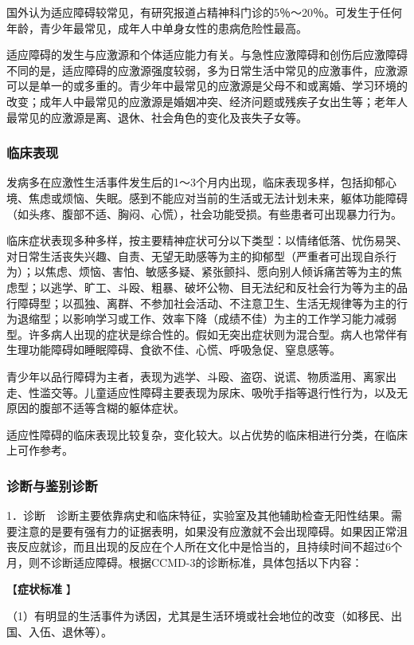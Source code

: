 国外认为适应障碍较常见，有研究报道占精神科门诊的5％～20％。可发生于任何年龄，青少年最常见，成年人中单身女性的患病危险性最高。

适应障碍的发生与应激源和个体适应能力有关。与急性应激障碍和创伤后应激障碍不同的是，适应障碍的应激源强度较弱，多为日常生活中常见的应激事件，应激源可以是单一的或多重的。青少年中最常见的应激源是父母不和或离婚、学习环境的改变；成年人中最常见的应激源是婚姻冲突、经济问题或残疾子女出生等；老年人最常见的应激源是离、退休、社会角色的变化及丧失子女等。

\subsubsection{临床表现}

发病多在应激性生活事件发生后的1～3个月内出现，临床表现多样，包括抑郁心境、焦虑或烦恼、失眠。感到不能应对当前的生活或无法计划未来，躯体功能障碍（如头疼、腹部不适、胸闷、心慌），社会功能受损。有些患者可出现暴力行为。

临床症状表现多种多样，按主要精神症状可分以下类型：以情绪低落、忧伤易哭、对日常生活丧失兴趣、自责、无望无助感等为主的抑郁型（严重者可出现自杀行为）；以焦虑、烦恼、害怕、敏感多疑、紧张颤抖、愿向别人倾诉痛苦等为主的焦虑型；以逃学、旷工、斗殴、粗暴、破坏公物、目无法纪和反社会行为等为主的品行障碍型；以孤独、离群、不参加社会活动、不注意卫生、生活无规律等为主的行为退缩型；以影响学习或工作、效率下降（成绩不佳）为主的工作学习能力减弱型。许多病人出现的症状是综合性的。假如无突出症状则为混合型。病人也常伴有生理功能障碍如睡眠障碍、食欲不佳、心慌、呼吸急促、窒息感等。

青少年以品行障碍为主者，表现为逃学、斗殴、盗窃、说谎、物质滥用、离家出走、性滥交等。儿童适应性障碍主要表现为尿床、吸吮手指等退行性行为，以及无原因的腹部不适等含糊的躯体症状。

适应性障碍的临床表现比较复杂，变化较大。以占优势的临床相进行分类，在临床上可作参考。

\subsubsection{诊断与鉴别诊断}

1．诊断　诊断主要依靠病史和临床特征，实验室及其他辅助检查无阳性结果。需要注意的是要有强有力的证据表明，如果没有应激就不会出现障碍。如果因正常沮丧反应就诊，而且出现的反应在个人所在文化中是恰当的，且持续时间不超过6个月，则不诊断适应障碍。根据CCMD-3的诊断标准，具体包括以下内容：

【\textbf{症状标准} 】

（1）有明显的生活事件为诱因，尤其是生活环境或社会地位的改变（如移民、出国、入伍、退休等）。

